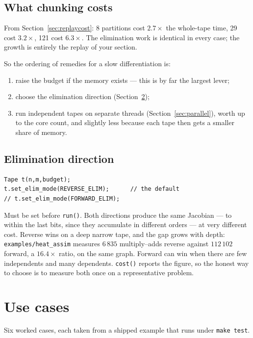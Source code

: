\documentclass[11pt,a4paper]{report}
\newcommand{\code}[1]{\texttt{#1}}
\begin{document}
\section{What chunking costs}

From Section~\ref{sec:replaycost}: 8 partitions cost $2.7\times$ the whole-tape
time, 29 cost $3.2\times$, 121 cost $6.3\times$. The elimination work is
identical in every case; the growth is entirely the replay of your section.

So the ordering of remedies for a slow differentiation is:

\begin{enumerate}
\item raise the budget if the memory exists --- this is by far the largest lever;
\item choose the elimination direction (Section~\ref{sec:direction});
\item run independent tapes on separate threads (Section~\ref{sec:parallel}),
      worth up to the core count, and slightly less because each tape then gets
      a smaller share of memory.
\end{enumerate}

\section{Elimination direction}
\label{sec:direction}

\begin{lstlisting}
Tape t(n,m,budget);
t.set_elim_mode(REVERSE_ELIM);      // the default
// t.set_elim_mode(FORWARD_ELIM);
\end{lstlisting}

Must be set before \code{run()}. Both directions produce the same Jacobian ---
to within the last bits, since they accumulate in different orders --- at very
different cost. Reverse wins on a deep narrow tape, and the gap grows with
depth: \code{examples/heat\_assim} measures $6\,835$ multiply--adds reverse
against $112\,102$ forward, a $16.4\times$ ratio, on the same graph. Forward can
win when there are few independents and many dependents. \code{cost()} reports
the figure, so the honest way to choose is to measure both once on a
representative problem.

\chapter{Use cases}

Six worked cases, each taken from a shipped example that runs under
\code{make test}.
\end{document}
